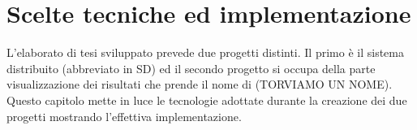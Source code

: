 \chapter{Scelte tecniche ed implementazione}
\label{chap:implementazione}
L'elaborato di tesi sviluppato prevede due progetti distinti. Il primo è il sistema distribuito (abbreviato in SD) ed il secondo progetto si occupa della parte visualizzazione dei risultati che prende il nome di (TORVIAMO UN NOME).
\\ Questo capitolo mette in luce le tecnologie adottate durante la creazione dei due progetti mostrando l'effettiva implementazione.  


